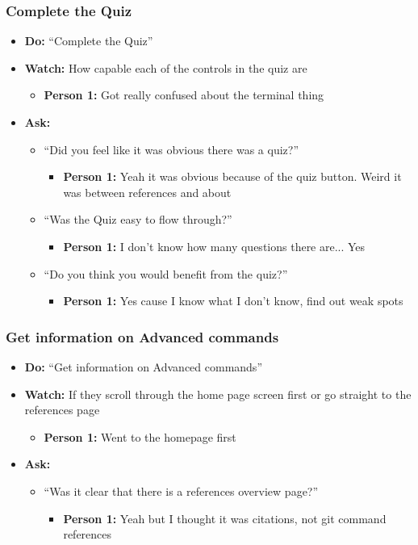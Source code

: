 \subsubsection{Complete the Quiz}
\begin{itemize}
	\item\textbf{Do:} ``Complete the Quiz''
	\item\textbf{Watch:} How capable each of the controls in the quiz are
	\begin{itemize}
		\item\textbf{Person 1:} Got really confused about the terminal thing
	\end{itemize}
	\item\textbf{Ask:}
	\begin{itemize}
		\item ``Did you feel like it was obvious there was a quiz?''
		\begin{itemize}
			\item\textbf{Person 1:} Yeah it was obvious because of the quiz button. Weird it was between references and about
		\end{itemize}
		\item ``Was the Quiz easy to flow through?''
		\begin{itemize}
			\item\textbf{Person 1:} I don't know how many questions there are... Yes
		\end{itemize}
		\item ``Do you think you would benefit from the quiz?''
		\begin{itemize}
			\item\textbf{Person 1:} Yes cause I know what I don't know, find out weak spots
		\end{itemize}
	\end{itemize}	
\end{itemize}


\subsubsection{Get information on Advanced commands}
\begin{itemize}
	\item\textbf{Do:} ``Get information on Advanced commands''
	\item\textbf{Watch:} If they scroll through the home page screen first or go straight to the references page
	\begin{itemize}
		\item\textbf{Person 1:} Went to the homepage first
	\end{itemize}
	\item\textbf{Ask:}
	\begin{itemize}
		\item ``Was it clear that there is a references overview page?''
		\begin{itemize}
			\item\textbf{Person 1:} Yeah but I thought it was citations, not git command references
		\end{itemize}
	\end{itemize}	
\end{itemize}


